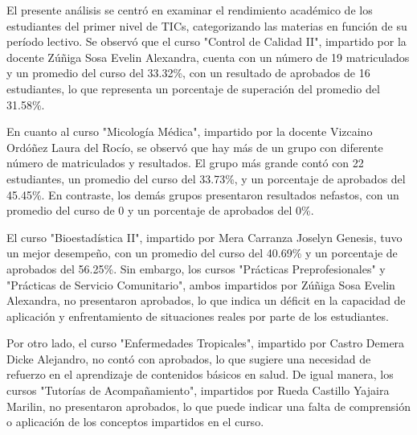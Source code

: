 El presente análisis se centró en examinar el rendimiento académico de los estudiantes del primer nivel de TICs, categorizando las materias en función de su período lectivo. Se observó que el curso "Control de Calidad II", impartido por la docente Zúñiga Sosa Evelin Alexandra, cuenta con un número de 19 matriculados y un promedio del curso del 33.32\%, con un resultado de aprobados de 16 estudiantes, lo que representa un porcentaje de superación del promedio del 31.58\%.

En cuanto al curso "Micología Médica", impartido por la docente Vizcaino Ordóñez Laura del Rocío, se observó que hay más de un grupo con diferente número de matriculados y resultados. El grupo más grande contó con 22 estudiantes, un promedio del curso del 33.73\%, y un porcentaje de aprobados del 45.45\%. En contraste, los demás grupos presentaron resultados nefastos, con un promedio del curso de 0 y un porcentaje de aprobados del 0\%.

El curso "Bioestadística II", impartido por Mera Carranza Joselyn Genesis, tuvo un mejor desempeño, con un promedio del curso del 40.69\% y un porcentaje de aprobados del 56.25\%. Sin embargo, los cursos "Prácticas Preprofesionales" y "Prácticas de Servicio Comunitario", ambos impartidos por Zúñiga Sosa Evelin Alexandra, no presentaron aprobados, lo que indica un déficit en la capacidad de aplicación y enfrentamiento de situaciones reales por parte de los estudiantes.

Por otro lado, el curso "Enfermedades Tropicales", impartido por Castro Demera Dicke Alejandro, no contó con aprobados, lo que sugiere una necesidad de refuerzo en el aprendizaje de contenidos básicos en salud. De igual manera, los cursos "Tutorías de Acompañamiento", impartidos por Rueda Castillo Yajaira Marilin, no presentaron aprobados, lo que puede indicar una falta de comprensión o aplicación de los conceptos impartidos en el curso.

